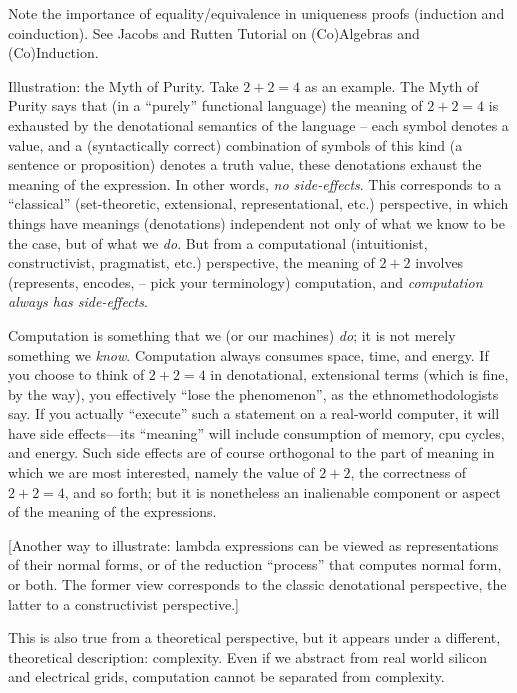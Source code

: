 \begin{ednote}
  Note the importance of equality/equivalence in uniqueness proofs
  (induction and coinduction).  See Jacobs and Rutten Tutorial on
  (Co)Algebras and (Co)Induction.
\end{ednote}

\begin{ednote}
  Illustration: the Myth of Purity.  Take \(2+2=4\) as an example.
  The Myth of Purity says that (in a ``purely'' functional language)
  the meaning of \(2+2=4\) is exhausted by the denotational semantics
  of the language -- each symbol denotes a value, and a (syntactically
  correct) combination of symbols of this kind (a sentence or
  proposition) denotes a truth value, these denotations exhaust the
  meaning of the expression.  In other words, \emph{no side-effects}.
  This corresponds to a ``classical'' (set-theoretic, extensional,
  representational, etc.) perspective, in which things have meanings
  (denotations) independent not only of what we know to be the case,
  but of what we \emph{do}.  But from a computational (intuitionist,
  constructivist, pragmatist, etc.) perspective, the meaning of
  \(2+2\) involves (represents, encodes, -- pick your terminology)
  computation, and \emph{computation always has side-effects}.

  Computation is something that we (or our machines) \emph{do}; it is
  not merely something we \emph{know}.  Computation always consumes
  space, time, and energy.  If you choose to think of \(2+2=4\) in
  denotational, extensional terms (which is fine, by the way), you
  effectively ``lose the phenomenon'', as the ethnomethodologists say.
  If you actually ``execute'' such a statement on a real-world
  computer, it will have side effects---its ``meaning'' will include
  consumption of memory, cpu cycles, and energy.  Such side effects
  are of course orthogonal to the part of meaning in which we are most
  interested, namely the value of \(2+2\), the correctness of
  \(2+2=4\), and so forth; but it is nonetheless an inalienable
  component or aspect of the meaning of the expressions.

  [Another way to illustrate: lambda expressions can be viewed as
    representations of their normal forms, or of the reduction
    ``process'' that computes normal form, or both.  The former view
    corresponds to the classic denotational perspective, the latter to
    a constructivist perspective.]

  This is also true from a theoretical perspective, but it appears
  under a different, theoretical description: complexity.  Even if we
  abstract from real world silicon and electrical grids, computation
  cannot be separated from complexity.


\end{ednote}
